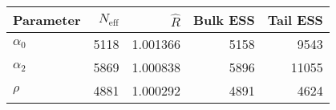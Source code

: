 \begin{table}[!h]
\centering
\begin{tabular}{>{\raggedright\arraybackslash}p{2cm}rrrr}
\toprule
Parameter & $N_{\text{eff}}$ & $\widehat{R}$ & Bulk ESS & Tail ESS\\
\midrule
\rowcolor{gray!6}  $\alpha_{0}$ & 5118 & 1.001366 & 5158 & 9543\\
$\alpha_{2}$ & 5869 & 1.000838 & 5896 & 11055\\
\rowcolor{gray!6}  $\rho$ & 4881 & 1.000292 & 4891 & 4624\\
\bottomrule
\end{tabular}
\end{table}